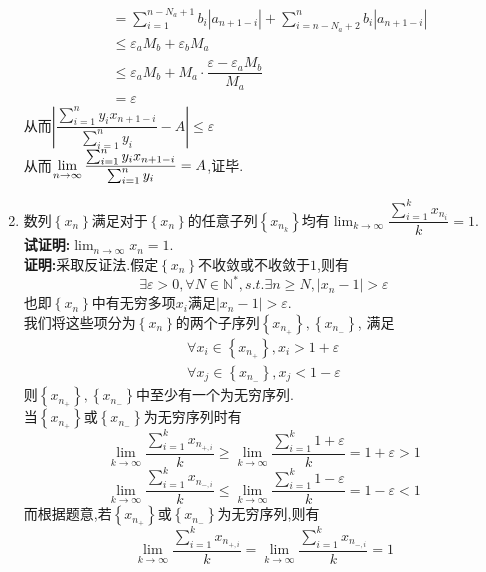 \documentclass[a4paper,oneside]{ctexart}
\begin{document}
\begin{enumerate}[1.]
$$\begin{aligned}
            &= \sum_{i=1}^{n-N_a+1}{b_i\left|a_{n+1-i}\right|}+\sum_{i=n-N_a+2}^{n}{b_i\left|a_{n+1-i}\right|}\\
            &\leqslant \varepsilon_aM_b+\varepsilon_bM_a \\
            &\leqslant \varepsilon_aM_b+M_a\cdot\dfrac{\varepsilon-\varepsilon_aM_b}{M_a} \\
            &=\varepsilon
          \end{aligned}$$
          从而$\displaystyle\left|\dfrac{\sum_{i=1}^{n}{y_ix_{n+1-i}}}{\sum_{i=1}^{n}{y_i}}-A\right|\leqslant\varepsilon$\\
          从而$\displaystyle\displaystyle\lim_{n\to\infty}{\dfrac{\sum_{i=1}^{n}{y_ix_{n+1-i}}}{\sum_{i=1}^{n}{y_i}}}=A$,证毕.
    \newpage
    \item 数列$\left\{ x_n\right\}$满足对于$\left\{ x_n\right\}$的任意子列$\left\{ x_{n_k}\right\}$均有$\displaystyle\lim_{k\to\infty}{\dfrac{\sum_{i=1}^{k}{x_{n_i}}}{k}}=1$.\\
          \textbf{试证明:}$\displaystyle\lim_{n\to\infty}{x_n}=1$.\\
          \textbf{证明:}采取反证法.假定$\left\{ x_n\right\}$不收敛或不收敛于$1$,则有
            $$\exists\varepsilon>0,\forall N\in\mathbb{N}^*,s.t.\exists n\geqslant N,\left\lvert x_n-1\right\rvert>\varepsilon$$
            也即$\left\{ x_n\right\}$中有无穷多项$x_i$满足$\left\lvert x_n-1\right\rvert>\varepsilon$.\\
            我们将这些项分为$\left\{ x_n\right\}$的两个子序列$\left\{ x_{n_+}\right\},\left\{ x_{n_-}\right\}$,
            满足$$\begin{aligned}
            \forall x_i\in\left\{ x_{n_+}\right\},x_i>1+\varepsilon \\
            \forall x_j\in\left\{ x_{n_-}\right\},x_j<1-\varepsilon
            \end{aligned}$$
            则$\left\{ x_{n_+}\right\},\left\{ x_{n_-}\right\}$中至少有一个为无穷序列.\\
            当$\left\{ x_{n_+}\right\}$或$\left\{ x_{n_-}\right\}$为无穷序列时有
            $$\lim_{k\to\infty}{\dfrac{\sum_{i=1}^{k}{x_{n_{+,i}}}}{k}}\geqslant \lim_{k\to\infty}{\dfrac{\sum_{i=1}^{k}{1+\varepsilon}}{k}}=1+\varepsilon>1$$
            $$\lim_{k\to\infty}{\dfrac{\sum_{i=1}^{k}{x_{n_{-,i}}}}{k}}\leqslant \lim_{k\to\infty}{\dfrac{\sum_{i=1}^{k}{1-\varepsilon}}{k}}=1-\varepsilon<1$$
            而根据题意,若$\left\{ x_{n_+}\right\}$或$\left\{ x_{n_-}\right\}$为无穷序列,则有
            $$\lim_{k\to\infty}{\dfrac{\sum_{i=1}^{k}{x_{n_{+,i}}}}{k}}=\lim_{k\to\infty}{\dfrac{\sum_{i=1}^{k}{x_{n_{-,i}}}}{k}=1}$$

\end{enumerate}
\end{document}
